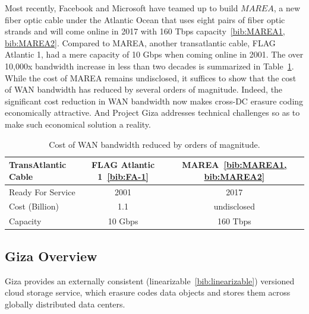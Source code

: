 Most recently, Facebook and Microsoft have teamed up to build $MAREA$, a new fiber optic cable under the Atlantic Ocean that uses eight pairs of fiber optic strands and will come online in 2017 with 160 Tbps capacity~\ref{bib:MAREA1, bib:MAREA2}. Compared to MAREA, another transatlantic cable, FLAG Atlantic 1, had a mere capacity of 10 Gbps when coming online in 2001. The over 10,000x bandwidth increase in less than two decades is summarized in Table~\ref{tab:mears}. While the cost of MAREA remains undisclosed, it suffices to show that the cost of WAN bandwidth has reduced by several orders of magnitude. Indeed, the significant cost reduction in WAN bandwidth now makes cross-DC erasure coding economically attractive. And Project Giza addresses technical challenges so as to make such economical solution a reality.

\begin{table}[thp]
\centering
\begin{tabular}{|l|c|c|}
\hline
TransAtlantic Cable             & FLAG Atlantic 1~\ref{bib:FA-1}    & MAREA~\ref{bib:MAREA1, bib:MAREA2}
\\ \hline \hline
Ready For Service               & 2001                              & 2017
\\ \hline
Cost (Billion)                  & 1.1                               & undisclosed
\\ \hline
Capacity                        & 10 Gbps                           & 160 Tbps
\\ \hline \hline
\end{tabular}
\caption{Cost of WAN bandwidth reduced by orders of magnitude.}
\label{tab:mears}
\end{table}


\subsection{Giza Overview}

Giza provides an externally consistent (linearizable~\ref{bib:linearizable}) versioned cloud storage service, which erasure codes data objects and stores them across globally distributed data centers.

